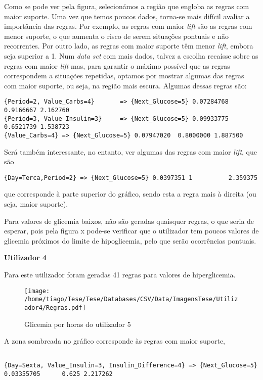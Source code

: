 Como se pode ver pela figura, selecionámos a região que engloba as regras com maior suporte. Uma vez que temos poucos dados, torna-se mais difícil avaliar a importância das regras. Por exemplo, as regras com maior \textit{lift} são as regras com menor suporte, o que aumenta o risco de serem situações pontuais e não recorrentes. Por outro lado, as regras com maior suporte têm menor \textit{lift}, embora seja superior a 1. Num \textit{data set} com mais dados, talvez a escolha recaísse sobre as regras com maior \textit{lift} mas, para garantir o máximo possível que as regras correspondem a situações repetidas, optamos por mostrar algumas das regras com maior suporte, ou seja, na região mais escura. Algumas dessas regras são:

\begin{lstlisting}
{Period=2, Value_Carbs=4}       => {Next_Glucose=5} 0.07284768  0.9166667 2.162760  
{Period=3, Value_Insulin=3}     => {Next_Glucose=5} 0.09933775  0.6521739 1.538723
{Value_Carbs=4} => {Next_Glucose=5} 0.07947020  0.8000000 1.887500
\end{lstlisting}

Será também interessante, no entanto, ver algumas das regras com maior \textit{lift}, que são

\begin{lstlisting}
{Day=Terca,Period=2} => {Next_Glucose=5} 0.0397351 1          2.359375
\end{lstlisting}

que corresponde à parte superior do gráfico, sendo esta a regra mais à direita (ou seja, maior suporte). 

Para valores de glicemia baixos, não são geradas quaisquer regras, o que seria de esperar, pois pela figura x pode-se verificar que o utilizador tem poucos valores de glicemia próximos do limite de hipoglicemia, pelo que serão ocorrências pontuais. 


\textbf{Utilizador 4}

Para este utilizador foram geradas 41 regras para valores de hiperglicemia.



\begin{figure}[H]
\centering
\texttt{[image: /home/tiago/Tese/Tese/Databases/CSV/Data/ImagensTese/Utilizador4/Regras.pdf]}
\caption{Glicemia por horas do utilizador 5}
\end{figure}
 A zona sombreada no gráfico corresponde às regras com maior suporte,
 

\begin{lstlisting}

{Day=Sexta, Value_Insulin=3, Insulin_Difference=4} => {Next_Glucose=5} 0.03355705      0.625 2.217262

\end{lstlisting}

